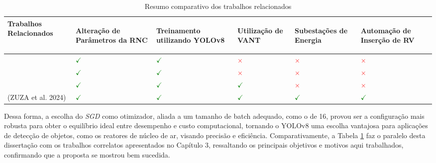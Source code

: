 \begin{table}[!hbt]
    \centering
    \caption{Resumo comparativo dos trabalhos relacionados}
    \begin{tabular}{ >{\centering\arraybackslash}m{5cm} | >{\centering\arraybackslash}m{2cm} | >{\centering\arraybackslash}m{2cm} | >{\centering\arraybackslash}m{2cm} | >{\centering\arraybackslash}m{2cm} | >{\centering\arraybackslash}m{2cm} }
    \hline
    \cellcolor[gray]{0.9} \textbf{Trabalhos Relacionados} & 
    \cellcolor[gray]{0.9} \begin{sideways} \textbf{Alteração de Parâmetros da RNC} \end{sideways} & 
    \cellcolor[gray]{0.9} \begin{sideways} \textbf{Treinamento utilizando YOLOv8} \end{sideways} & 
    \cellcolor[gray]{0.9} \begin{sideways} \textbf{Utilização de VANT} \end{sideways} & 
    \cellcolor[gray]{0.9} \begin{sideways} \textbf{Subestações de Energia} \end{sideways} &
    \cellcolor[gray]{0.9} \begin{sideways} \textbf{Automação de Inserção de RV} \end{sideways} \\
    \hline 
    \cite{gonzaga2023identificaccao} & \textcolor{green}{\(\checkmark\)} & \textcolor{green}{\(\checkmark\)} & \textcolor{red}{\(\times\)} & \textcolor{red}{\(\times\)} & \textcolor{red}{\(\times\)} \\
    \hline
    \cite{diascomparaccao} & \textcolor{green}{\(\checkmark\)} & \textcolor{green}{\(\checkmark\)} & \textcolor{red}{\(\times\)} & \textcolor{red}{\(\times\)} & \textcolor{red}{\(\times\)} \\
    \hline
    \cite{wang2023uav} & \textcolor{green}{\(\checkmark\)} & \textcolor{green}{\(\checkmark\)} & \textcolor{green}{\(\checkmark\)} & \textcolor{red}{\(\times\)} & \textcolor{red}{\(\times\)} \\
    \hline
    (ZUZA et al. 2024) & \textcolor{green}{\(\checkmark\)} & \textcolor{green}{\(\checkmark\)} & \textcolor{green}{\(\checkmark\)} & \textcolor{green}{\(\checkmark\)} & \textcolor{green}{\(\checkmark\)} \\
    \end{tabular}
    \label{tab:relacionadoZuza}
\end{table}

Dessa forma, a escolha do \textit{SGD} como otimizador, aliada a um tamanho de batch adequado, como o de 16, provou ser a configuração mais robusta para obter o equilíbrio ideal entre desempenho e custo computacional, tornando o YOLOv8 uma escolha vantajosa para aplicações de detecção de objetos, como os reatores de núcleo de ar, visando precisão e eficiência. Comparativamente, a Tabela \ref{tab:relacionadoZuza} faz o paralelo desta dissertação com os trabalhos correlatos apresentados no Capítulo 3, ressaltando os principais objetivos e motivos aqui trabalhados, confirmando que a proposta se mostrou bem sucedida.





